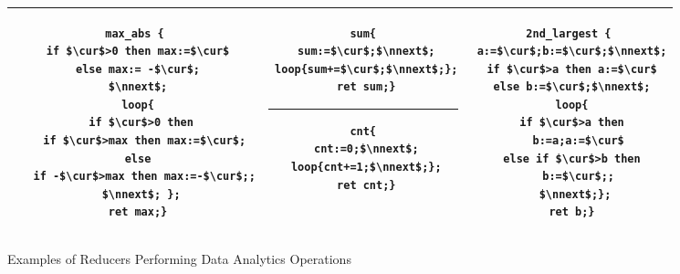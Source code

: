 \begin{figure}
	\centering
	\lstset{language=C,
		basicstyle=\ttfamily\scriptsize}
	\begin{tabular}{|c|c|c|}
		\hline
		\begin{minipage}[t]{0.39\textwidth}
		\vspace{-0.5cm}
			\begin{lstlisting}[mathescape=true]
max_abs {
 if $\cur$>0 then max:=$\cur$
 else max:= -$\cur$;
 $\nnext$;
 loop{
  if $\cur$>0 then
   if $\cur$>max then max:=$\cur$;
  else 
   if -$\cur$>max then max:=-$\cur$;;
  $\nnext$; };
 ret max;}
	\end{lstlisting}
		\end{minipage}&
		\begin{minipage}[t]{0.27\textwidth}
		\vspace{-0.5cm}
			\begin{lstlisting}[mathescape=true]
sum{
 sum:=$\cur$;$\nnext$;
 loop{sum+=$\cur$;$\nnext$;};
 ret sum;}
			\end{lstlisting}
\hrule\vspace{0.1cm}%
			\begin{lstlisting}[mathescape=true]
cnt{
 cnt:=0;$\nnext$;
 loop{cnt+=1;$\nnext$;};
 ret cnt;}
			\end{lstlisting}			
		\end{minipage}&
		\begin{minipage}[t]{0.30\textwidth}
		\vspace{-0.5cm}			
			\begin{lstlisting}[mathescape=true]
2nd_largest {
 a:=$\cur$;b:=$\cur$;$\nnext$;
 if $\cur$>a then a:=$\cur$
 else b:=$\cur$;$\nnext$;
 loop{
  if $\cur$>a then 
   b:=a;a:=$\cur$
  else if $\cur$>b then 
   b:=$\cur$;;
  $\nnext$;};
 ret b;}
			\end{lstlisting}		
		\end{minipage}\\
		\hline		
	\end{tabular}
	\caption{Examples of Reducers Performing Data Analytics Operations}
	\label{fig:examples}
\end{figure}